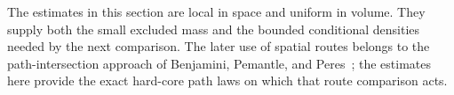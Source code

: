 The estimates in this section are local in space and uniform in volume.
They supply both the small excluded mass and the bounded conditional
densities needed by the next comparison.  The later use of spatial
routes belongs to the path-intersection approach of
Benjamini, Pemantle, and Peres~\cite{BPP}; the estimates here provide
the exact hard-core path laws on which that route comparison acts.
